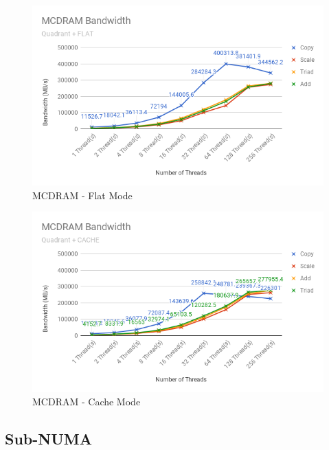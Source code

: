 \documentclass[bsc,frontabs,twoside,singlespacing,parskip,deptreport]{infthesis}     %
\begin{document}
\begin{figure}[!h]
    \centering
    \includegraphics[width=\textwidth]{Results/mcdram_quad_f.png}
    \caption{MCDRAM - Flat Mode}
    \label{res:mcdram-quad-f}
\end{figure}

\begin{figure}[!h]
    \centering
    \includegraphics[width=\textwidth]{Results/mcdram_quad_c.png}
    \caption{MCDRAM - Cache Mode}
    \label{res:mcdram-quad-c}
\end{figure}

\newpage

\subsection{Sub-NUMA}
\end{document}
